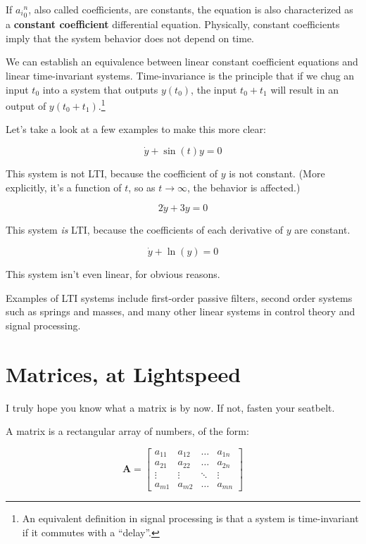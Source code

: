 \documentclass{report}
\begin{document}
\begin{onehalfspacing}
\begin{flushleft}
If \({a_i}_0^n\), also called coefficients, are constants, the equation is also characterized as a \textbf{constant coefficient} differential equation. Physically, constant coefficients imply that the system behavior does not depend on time. 

\medskip

We can establish an equivalence between linear constant coefficient equations and linear time-invariant systems. Time-invariance is the principle that if we chug an input \(t_0\) into a system that outputs \(y(t_0)\), the input \(t_0 + t_1\) will result in an output of \(y(t_0 + t_1)\).\footnote{An equivalent definition in signal processing is that a system is time-invariant if it commutes with a ``delay''.}

\medskip

Let's take a look at a few examples to make this more clear:

\vspace{-0.1in}
\[\dot{y} + \sin(t) y = 0\]

This system is not LTI, because the coefficient of \(y\) is not constant. (More explicitly, it's a function of \(t\), so as \(t \to \infty\), the behavior is affected.)

\vspace{-0.1in}
\[2 \dot{y} + 3 y = 0\]

This system \textit{is} LTI, because the coefficients of each derivative of \(y\) are constant.

\vspace{-0.1in}
\[\dot{y} + \ln(y) = 0\]

This system isn't even linear, for obvious reasons.

\medskip

Examples of LTI systems include first-order passive filters, second order systems such as springs and masses, and many other linear systems in control theory and signal processing.

\section{Matrices, at Lightspeed}

I truly hope you know what a matrix is by now. If not, fasten your seatbelt.

\medskip

A matrix is a rectangular array of numbers, of the form:

\vspace{-0.1in}
\[\textbf{A} = \begin{bmatrix}
    a_{11} & a_{12} & \dots & a_{1n}\\ a_{21} & a_{22} & \dots & a_{2n}\\ \vdots & \vdots & \ddots & \vdots \\ a_{m1} & a_{m2} & \dots & a_{mn}
\end{bmatrix}\]


\end{flushleft}
\end{onehalfspacing}
\end{document}
